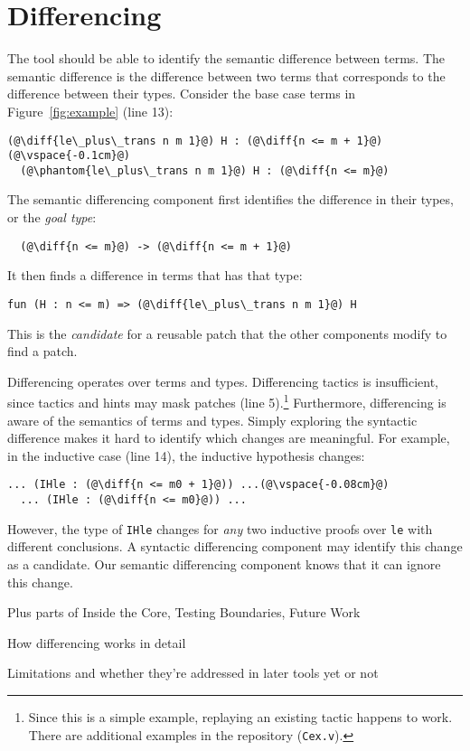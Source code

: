 \section{Differencing}
\label{sec:pumpkin-diff}


The tool should be able to identify the semantic difference between terms.
The semantic difference is the difference between two terms that corresponds to
the difference between their types. Consider the base case terms in Figure~\ref{fig:example} (line 13):

\begin{lstlisting}[language=coq]
  (@\diff{le\_plus\_trans n m 1}@) H : (@\diff{n <= m + 1}@)(@\vspace{-0.1cm}@)
  (@\phantom{le\_plus\_trans n m 1}@) H : (@\diff{n <= m}@)
\end{lstlisting}
The semantic differencing component first identifies the difference in their types, or the \textit{goal type}:

\begin{lstlisting}
  (@\diff{n <= m}@) -> (@\diff{n <= m + 1}@)
\end{lstlisting}
It then finds a difference in terms that has that type:

\begin{lstlisting}[language=coq]
  fun (H : n <= m) => (@\diff{le\_plus\_trans n m 1}@) H
\end{lstlisting}
This is the \emph{candidate} for a reusable patch that the other components modify to find a patch.

Differencing operates over terms and types. Differencing tactics
is insufficient, since tactics and hints may mask patches
(line 5).\footnote{Since this is a simple example, replaying an existing tactic happens to work. There
are additional examples in the repository (\lstinline{Cex.v}).}
Furthermore, differencing is aware of the semantics of terms and types.
Simply exploring the syntactic difference %
makes it hard to identify
which changes are meaningful.
For example, in the inductive case (line 14), the inductive hypothesis
changes:

\begin{lstlisting}[language=coq]
  ... (IHle : (@\diff{n <= m0 + 1}@)) ...(@\vspace{-0.08cm}@)
  ... (IHle : (@\diff{n <= m0}@)) ...
\end{lstlisting}

However, the type of \lstinline{IHle} changes for \emph{any} two inductive proofs over \lstinline{le}
with different conclusions. A syntactic differencing component 
may identify this change as a candidate.
Our semantic differencing component knows that it can ignore this change.

Plus parts of Inside the Core, Testing Boundaries, Future Work

How differencing works in detail

Limitations and whether they're addressed in later tools yet or not

